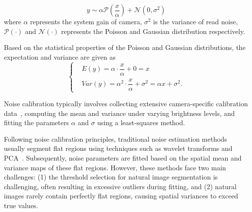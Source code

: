 \documentclass[lettersize,journal]{IEEEtran}
\begin{document}
	\begin{equation}
		y \sim \alpha \mathcal{P}\left(\frac{x}{\alpha}\right) + \mathcal{N}(0, \sigma^2)
	\end{equation}
	where $\alpha$ represents the system gain of camera, $\sigma^2$ is the variance of read noise, $\mathcal{P}(\cdot)$ and $\mathcal{N}(\cdot)$ represents the Poisson and Gaussian distribution respectively.
	
	Based on the statistical properties of the Poisson and Gaussian distributions, the expectation and variance are given as
	\begin{equation}
		\begin{cases}
			&E(y) = \alpha \cdot \dfrac{x}{\alpha} + 0 = x \\ &Var(y) = \alpha^2 \cdot \dfrac{x}{\alpha} + \sigma^2 = \alpha x + \sigma^2.
		\end{cases}
	\end{equation}
	
	Noise calibration typically involves collecting extensive camera-specific calibration data~\cite{TPAMI94/CCD,EMVA1288,TPAMI21/ELD}, computing the mean and variance under varying brightness levels, and fitting the parameters $\alpha$ and $\sigma$ using a least-squares method.
	
	Following noise calibration principles, traditional noise estimation methods usually segment flat regions using techniques such as wavelet transforms and PCA~\cite{meer1990fast,immerkaer1996fast,P-G,TIP12/PCA,ICIP13/Liu,TIP21/DWTNE}. Subsequently, noise parameters are fitted based on the spatial mean and variance maps of these flat regions. However, these methods face two main challenges: (1) the threshold selection for natural image segmentation is challenging, often resulting in excessive outliers during fitting, and (2) natural images rarely contain perfectly flat regions, causing spatial variances to exceed true values.
	
	
\end{document}
